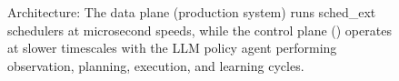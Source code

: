 \begin{figure}[h]
\centering
{}
\caption{\sys Architecture: The data plane (production system) runs sched\_ext schedulers at microsecond speeds, while the control plane (\sys) operates at slower timescales with the LLM policy agent performing observation, planning, execution, and learning cycles.}
\label{fig:architecture}
\end{figure}
